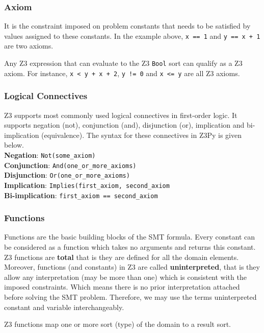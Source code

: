 \subsubsection{Axiom}
It is the constraint imposed on problem constants that needs to be satisfied by values assigned to these constants. In the example above, \lstinline|x == 1| and \lstinline|y == x + 1| are two axioms.

Any Z3 expression that can evaluate to the Z3 \lstinline|Bool| sort can qualify as a Z3 axiom. For instance, \lstinline|x < y + x + 2|, \lstinline|y != 0| and \lstinline|x <= y| are all Z3 axioms.


\subsubsection{Logical Connectives}
Z3 supports most commonly used logical connectives in first-order logic. It supports negation (not), conjunction (and), disjunction (or), implication and bi-implication (equivalence). The syntax for these connectives in Z3Py is given below.\\
\textbf{Negation}: \lstinline|Not(some_axiom)|\\
\textbf{Conjunction}: \lstinline|And(one_or_more_axioms)|\\
\textbf{Disjunction}: \lstinline|Or(one_or_more_axioms)|\\
\textbf{Implication}: \lstinline|Implies(first_axiom, second_axiom|\\
\textbf{Bi-implication}: \lstinline|first_axiom == second_axiom|\\


\subsubsection{Functions}
Functions are the basic building blocks of the SMT formula. Every constant can be considered as a function which takes no arguments and returns this constant.
Z3 functions are \textbf{total} that is they are defined for all the domain elements. Moreover, functions (and constants) in Z3 are called \textbf{uninterpreted}, that is they allow any interpretation (may be more than one) which is consistent with the imposed constraints. Which means there is no prior interpretation attached before solving the SMT problem. Therefore, we may use the terms uninterpreted constant and variable interchangeably.

Z3 functions map one or more sort (type) of the domain to a result sort.

